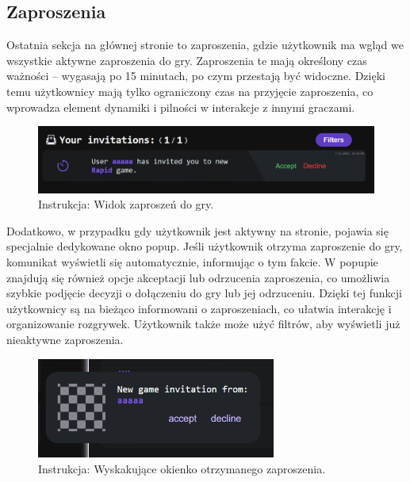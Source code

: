 \documentclass[12pt,a4paper]{article}
\begin{document}
\newpage

\subsection{Zaproszenia}
Ostatnia sekcja na głównej stronie to zaproszenia, gdzie użytkownik ma wgląd we wszystkie aktywne zaproszenia do gry. Zaproszenia te mają określony czas ważności – wygasają po 15 minutach, po czym przestają być widoczne. Dzięki temu użytkownicy mają tylko ograniczony czas na przyjęcie zaproszenia, co wprowadza element dynamiki i pilności w interakcje z innymi graczami.

\vspace{0.5cm}
\begin{figure}[h!]
    \centering
    \includegraphics[width=1\textwidth]{images/ins_min_inv_card.png}
    \caption{Instrukcja: Widok zaproszeń do gry.}
\end{figure}
\vspace{0.5cm}

\noindent
Dodatkowo, w przypadku gdy użytkownik jest aktywny na stronie, pojawia się specjalnie dedykowane okno popup. Jeśli użytkownik otrzyma zaproszenie do gry, komunikat wyświetli się automatycznie, informując o tym fakcie. W popupie znajdują się również opcje akceptacji lub odrzucenia zaproszenia, co umożliwia szybkie podjęcie decyzji o dołączeniu do gry lub jej odrzuceniu. Dzięki tej funkcji użytkownicy są na bieżąco informowani o zaproszeniach, co ułatwia interakcję i organizowanie rozgrywek. Użytkownik także może użyć filtrów, aby wyświetli już nieaktywne zaproszenia.

\vspace{0.5cm}
\begin{figure}[h!]
    \centering
    \includegraphics[width=0.7\textwidth]{images/ins_min_inv_popup.png}
    \caption{Instrukcja: Wyskakujące okienko otrzymanego zaproszenia.}
\end{figure}
\vspace{0.5cm}
\end{document}
